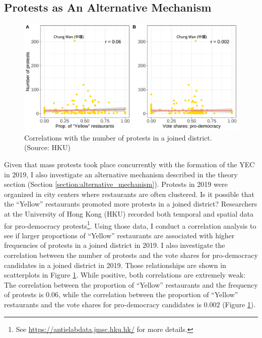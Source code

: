 \documentclass[letterpaper, 12pt]{article}
\begin{document}
\subsection{Protests as An Alternative Mechanism}
\begin{figure}[!h]
    \centering
    \includegraphics[scale=0.7]{Visuals/plt_cor_protests.pdf}
    \caption{Correlations with the number of protests in a joined district. (Source: HKU)}
    \label{fig: cor_protests}
\end{figure}

Given that mass protests took place concurrently with the formation of the YEC in 2019, I also investigate an alternative mechanism described in the theory section (Section \ref{section:alternative_mechanism}). Protests in 2019 were organized in city centers where restaurants are often clustered. Is it possible that the ``Yellow'' restaurants promoted more protests in a joined district? Researchers at the University of Hong Kong (HKU) recorded both temporal and spatial data for pro-democracy protests\footnote{See \url{https://antielabdata.jmsc.hku.hk/} for more details.}. Using those data, I conduct a correlation analysis to see if larger proportions of ``Yellow'' restaurants are associated with higher frequencies of protests in a joined district in 2019. I also investigate the correlation between the number of protests and the vote shares for pro-democracy candidates in a joined district in 2019. Those relationships are shown in scatterplots in Figure \ref{fig: cor_protests}. While positive, both correlations are extremely weak: The correlation between the proportion of ``Yellow'' restaurants and the frequency of protests is $0.06$, while the correlation between the proportion of ``Yellow'' restaurants and the vote shares for pro-democracy candidates is $0.002$ (Figure \ref{fig: cor_protests}).
\end{document}
